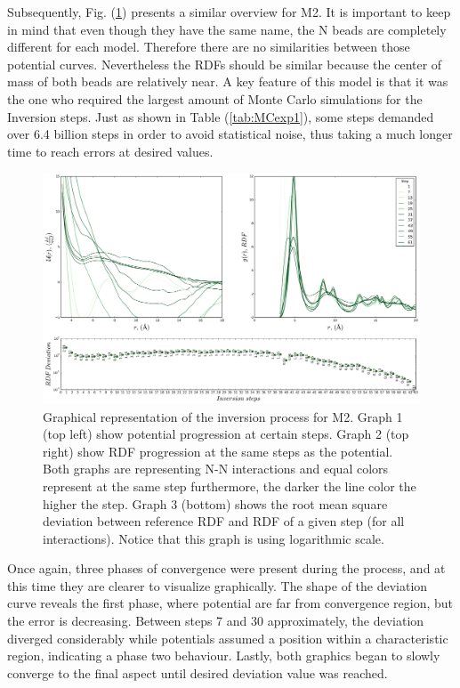 \documentclass[10pt,a4paper,twoside]{article}
\begin{document}
Subsequently, Fig. (\ref{Fig:convM2}) presents a similar overview for M2. It is important to keep in mind that even though they have the same name, the N beads are completely different for each model. Therefore there are no similarities between those potential curves. Nevertheless the RDFs should be similar because the center of mass of both beads are relatively near. A key feature of this model is that it was the one who required the largest amount of Monte Carlo simulations for the Inversion steps. Just as shown in Table (\ref{tab:MCexp1}), some steps demanded over 6.4 billion steps in order to avoid statistical noise, thus taking a much longer time to reach errors at desired values.

\begin{figure}[H]
  \begin{center}
	\includegraphics[width=1 \textwidth]{./graphs/ConvM2}
	\caption{Graphical representation of the inversion process for M2. Graph 1 (top left) show potential progression at certain steps. Graph 2 (top right) show RDF progression at the same steps as the potential. Both graphs are representing N-N interactions and equal colors represent at the same step furthermore, the darker the line color the higher the step. Graph 3 (bottom) shows the root mean square deviation between reference RDF and RDF of a given step (for all interactions). Notice that this graph is using logarithmic scale.}
	\label{Fig:convM2}
  \end{center}
\end{figure} 
 
	Once again, three phases of convergence were present during the process, and at this time they are clearer to visualize graphically. The shape of the deviation curve reveals the first phase, where potential are far from convergence region, but the error is decreasing. Between 
steps 7 and 30 approximately, the deviation diverged considerably while potentials assumed a position within a characteristic region, indicating a phase two behaviour. Lastly, both graphics began to slowly converge to the final aspect until desired deviation value was reached.
\end{document}
